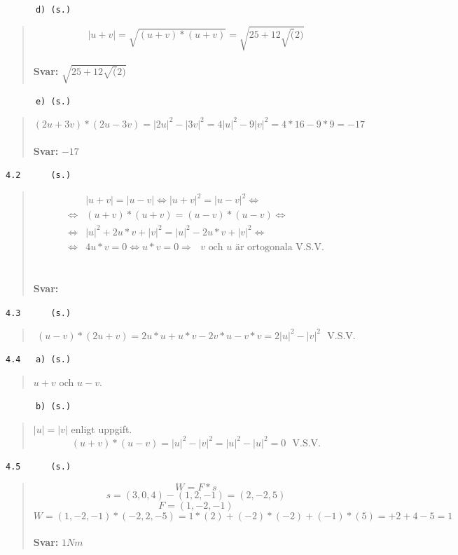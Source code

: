 \documentclass[a4paper]{article}
\newcommand{\tskcol}[1]{\textcolor{tskcol}{#1}}
\begin{document}
\texttt{\tskcol{~~~~~~d) (s.)}}
\begin{quotation}
	\noindent
	\[|u+v|=\sqrt{(u+v)*(u+v)}=\sqrt{25+12\sqrt(2)}\]
	\\
	\textbf{Svar:} $\sqrt{25+12\sqrt(2)}$
\end{quotation}

\texttt{\tskcol{~~~~~~e) (s.)}}
\begin{quotation}
	\noindent
	\[(2u+3v)*(2u-3v)=|2u|^2-|3v|^2=4|u|^2-9|v|^2=4*16-9*9=-17\]
	\\
	\textbf{Svar:} $-17$
\end{quotation}

\texttt{\tskcol{4.2~~~~~ (s.)}}
\begin{quotation}
	\noindent
	\begin{align*}
	&|u+v|=|u-v| \Leftrightarrow
	|u+v|^2=|u-v|^2 \Leftrightarrow \\ \Leftrightarrow
	&(u+v)*(u+v)=(u-v)*(u-v) \Leftrightarrow \\ \Leftrightarrow
	&|u|^2+2u*v+|v|^2=|u|^2-2u*v+|v|^2 \Leftrightarrow \\ \Leftrightarrow
	&4u*v=0 \Leftrightarrow
	u*v=0 \Rightarrow
	\text{ $v$ och $u$ är ortogonala V.S.V.}
	\end{align*}
	\\ \\
	\textbf{Svar:}
\end{quotation}

\texttt{\tskcol{4.3~~~~~ (s.)}}
\begin{quotation}
	\noindent
	\[(u-v)*(2u+v)=
	2u*u+u*v-2v*u-v*v=
	2|u|^2-|v|^2 \text{~~V.S.V.}\]
\end{quotation}

\texttt{\tskcol{4.4~~~a) (s.)}}
\begin{quotation}
	\noindent
	$u+v$ och $u-v$.
\end{quotation}

\texttt{\tskcol{~~~~~~b) (s.)}}
\begin{quotation}
	\noindent
	$|u|=|v|$ enligt uppgift.
	\[(u+v)*(u-v)=|u|^2-|v|^2=|u|^2-|u|^2=0 \text{~~V.S.V.}\]
\end{quotation}

\texttt{\tskcol{4.5~~~~~ (s.)}}
\begin{quotation}
	\noindent
	\[W=F*s\]
	\[s=(3,0,4)-(1,2,-1)=(2,-2,5)\]
	\[F=(1,-2,-1)\]
	\[W=(1,-2,-1)*(-2,2,-5)=
	1*(2)+(-2)*(-2)+(-1)*(5)=+2+4-5=1\]
	\\
	\textbf{Svar:} $1Nm$
\end{quotation}
\end{document}
